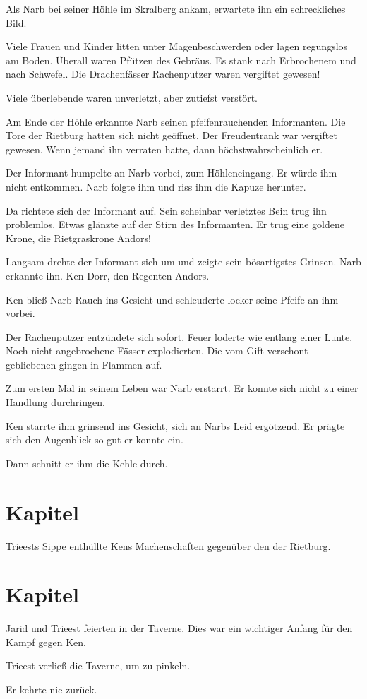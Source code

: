 Als Narb bei seiner Höhle im Skralberg ankam, erwartete ihn ein schreckliches Bild. 

Viele Frauen und Kinder litten unter Magenbeschwerden oder lagen regungslos am Boden. Überall waren Pfützen des Gebräus. Es stank nach Erbrochenem und nach Schwefel. Die Drachenfässer Rachenputzer waren vergiftet gewesen!

Viele überlebende  waren unverletzt, aber zutiefst verstört.

Am Ende der Höhle erkannte Narb seinen pfeifenrauchenden Informanten. Die Tore der Rietburg hatten sich nicht geöffnet. Der Freudentrank war vergiftet gewesen. Wenn jemand ihn verraten hatte, dann höchstwahrscheinlich er.

Der Informant humpelte an Narb vorbei, zum Höhleneingang. Er würde ihm nicht entkommen. Narb folgte ihm und riss ihm die Kapuze herunter.

Da richtete sich der Informant auf. Sein scheinbar verletztes Bein trug ihn problemlos. Etwas glänzte auf der Stirn des Informanten. Er trug eine goldene Krone, die Rietgraskrone Andors!

Langsam drehte der Informant sich um und zeigte sein bösartigstes Grinsen. Narb erkannte ihn. Ken Dorr, den Regenten Andors.

Ken bließ Narb Rauch ins Gesicht und schleuderte locker seine Pfeife an ihm vorbei. 

Der Rachenputzer entzündete sich sofort. Feuer loderte wie entlang einer Lunte. Noch nicht angebrochene Fässer explodierten. Die vom Gift verschont gebliebenen  gingen in Flammen auf.

Zum ersten Mal in seinem Leben war Narb erstarrt. Er konnte sich nicht zu einer Handlung durchringen. 

Ken starrte ihm grinsend ins Gesicht, sich an Narbs Leid ergötzend. Er prägte sich den Augenblick so gut er konnte ein.

Dann schnitt er ihm die Kehle durch.


\newpage
\section{Kapitel}

Trieests Sippe enthüllte Kens Machenschaften gegenüber den  der Rietburg.




\newpage
\section{Kapitel}

Jarid und Trieest feierten in der Taverne. Dies war ein wichtiger Anfang für den Kampf gegen Ken.

Trieest verließ die Taverne, um zu pinkeln.

Er kehrte nie zurück.






